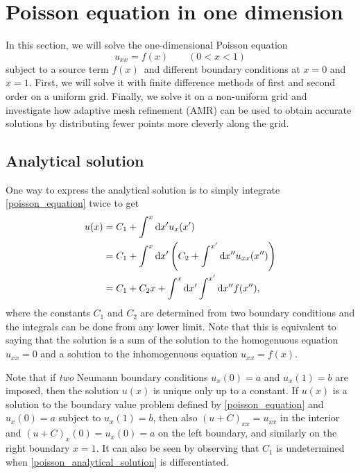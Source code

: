 \section{Poisson equation in one dimension}
\label{task_1}

In this section, we will solve the one-dimensional Poisson equation
\begin{equation}
u_{xx} = f(x) \qquad (0 < x < 1)
\label{poisson_equation}
\end{equation}
subject to a source term $f(x)$ and different boundary conditions at $x = 0$ and $x = 1$.
First, we will solve it with finite difference methods of first and second order on a uniform grid.
Finally, we solve it on a non-uniform grid and investigate how adaptive mesh refinement (AMR) can be used to obtain accurate solutions by distributing fewer points more cleverly along the grid.

\subsection{Analytical solution}

One way to express the analytical solution is to simply integrate \cref{poisson_equation} twice to get
\begin{equation}
\begin{split}
u(x) &= C_1 + \int^x \dif x' u_x(x') \\
     &= C_1 + \int^x \dif x' \left(C_2 + \int^{x'} \dif x'' u_{xx}(x'')\right) \\
     &= C_1 + C_2 x + \int^x \dif x' \int^{x'} \dif x'' f(x''),
\label{poisson_analytical_solution}
\end{split}
\end{equation}
where the constants $C_1$ and $C_2$ are determined from two boundary conditions and the integrals can be done from any lower limit.
Note that this is equivalent to saying that the solution is a sum of the solution to the homogenuous equation $u_{xx} = 0$ and a solution to the inhomogenuous equation $u_{xx} = f(x)$.

Note that if \emph{two} Neumann boundary conditions $u_x(0) = a$ and $u_x(1) = b$ are imposed, then the solution $u(x)$ is unique only up to a constant.
If $u(x)$ is a solution to the boundary value problem defined by \cref{poisson_equation} and $u_x(0) = a$ subject to $u_x(1) = b$, then also $(u+C)_{xx} = u_{xx}$ in the interior and $(u+C)_x(0) = u_x(0) = a$ on the left boundary, and similarly on the right boundary $x=1$.
It can also be seen by observing that $C_1$ is undetermined when \ref{poisson_analytical_solution} is differentiated.


